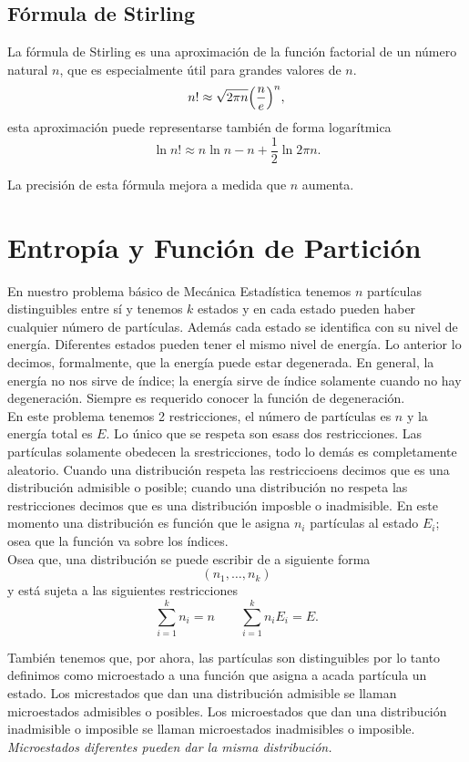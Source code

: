 \subsection{Fórmula de Stirling}
La fórmula de Stirling es una aproximación de la función factorial de un número natural $n$, que es especialmente útil para grandes valores de $n$.
    $$ n! \approx \sqrt{2\pi n} \qty(\frac{n}{e})^n, $$
esta aproximación puede representarse también de forma logarítmica
    $$ \ln{n!} \approx n\ln{n} - n + \frac{1}{2} \ln{2\pi n}. $$

La precisión de esta fórmula mejora a medida que $n$ aumenta.


\section{Entropía y Función de Partición}
En nuestro problema básico de Mecánica Estadística tenemos $n$ partículas distinguibles entre sí y tenemos $k$ estados y en cada estado pueden haber cualquier número de partículas. Además cada estado se identifica con su nivel de energía. Diferentes estados pueden tener el mismo nivel de energía. Lo anterior lo decimos, formalmente, que la energía puede estar degenerada. En general, la energía no nos sirve de índice; la energía sirve de índice solamente cuando no hay degeneración. Siempre es requerido conocer la función de degeneración. \\

En este problema tenemos 2 restricciones, el número de partículas es $n$ y la energía total es $E$. Lo único que se respeta son esass dos restricciones. Las partículas solamente obedecen la srestricciones, todo lo demás es completamente aleatorio. Cuando una distribución respeta las restriccioens decimos que es una distribución admisible o posible; cuando una distribución no respeta las restricciones decimos que es una distribución imposble o inadmisible. En este momento una distribución es función que le asigna $n_i$ partículas al estado $E_i$; osea que la función va sobre los índices. \\

Osea que, una distribución se puede escribir de a siguiente forma
	$$ (n_1 ,\ldots ,n_k) $$
y está sujeta a las siguientes restricciones
	$$ \sum _{i=1} ^k n_i = n \qquad \sum _{i=1} ^k n_i E_i = E. $$

También tenemos que, por ahora, las partículas son distinguibles por lo tanto definimos como microestado a una función que asigna a acada partícula un estado. Los micrestados que dan una distribución admisible se llaman microestados admisibles o posibles. Los microestados que dan una distribución inadmisible o imposible se llaman microestados inadmisibles o imposible. \textit{Microestados diferentes pueden dar la misma distribución.}

